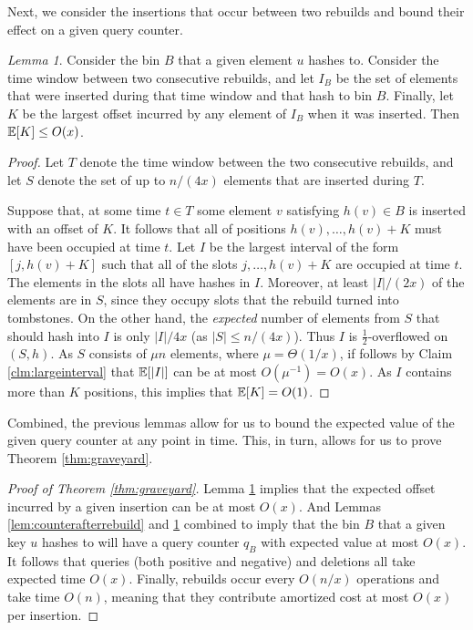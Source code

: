 \documentclass[10pt]{article}
\theoremstyle{remark}
\newtheorem{lemma}[thm]{Lemma}
\theoremstyle{remark}
\begin{document}
Next, we consider the insertions that occur between two rebuilds and bound their effect on a given query counter.

\begin{lemma}
Consider the bin $B$ that a given element $u$ hashes to. Consider the time window between two consecutive rebuilds, and let $I_B$ be the set of elements that were inserted during that time window and that hash to bin $B$. Finally, let $K$ be the largest offset incurred by any element of $I_B$ when it was inserted. Then $\mathbb{E}[K] \le O(x)$.
\label{lem:counterbetweenrebuilds}
\end{lemma}
\begin{proof}
Let $T$ denote the time window between the two consecutive rebuilds, and let $S$ denote the set of up to $n / (4x)$ elements that are inserted during $T$.

Suppose that, at some time $t \in T$ some element $v$ satisfying $h(v) \in B$ is inserted with an offset of $K$. It follows that all of positions $h(v), \ldots, h(v) + K$ must have been occupied at time $t$. Let $I$ be the largest interval of the form $[j, h(v) + K]$ such that all of the slots $j, \ldots, h(v) + K$ are occupied at time $t$. The elements in the slots all have hashes in $I$. Moreover, at least $|I| / (2x)$ of the elements are in $S$, since they occupy slots that the rebuild turned into tombstones. On the other hand, the \emph{expected} number of elements from $S$ that should hash into $I$ is only $|I| / 4x$ (as $|S| \le n/(4x)$). Thus $I$ is $\frac{1}{2}$-overflowed on $(S, h)$. As $S$ consists of $\mu n$ elements, where $\mu = \Theta(1/x)$, if follows by Claim \ref{clm:largeinterval} that $\mathbb{E}[|I|]$ can be at most $O(\mu^{-1}) = O(x)$. As $I$ contains more than $K$ positions, this implies that $\mathbb{E}[K] = O(1)$. 
\end{proof}

Combined, the previous lemmas allow for us to bound the expected value of the given query counter at any point in time. This, in turn, allows for us to prove Theorem \ref{thm:graveyard}.

\begin{proof}[Proof of Theorem \ref{thm:graveyard}]
Lemma \ref{lem:counterbetweenrebuilds} implies that the expected offset incurred by a given insertion can be at most $O(x)$. And Lemmas \ref{lem:counterafterrebuild} and \ref{lem:counterbetweenrebuilds} combined to imply that the bin $B$ that a given key $u$ hashes to will have a query counter $q_B$ with expected value at most $O(x)$. It follows that queries (both positive and negative) and deletions all take expected time $O(x)$. Finally, rebuilds occur every $O(n/x)$ operations and take time $O(n)$, meaning that they contribute amortized cost at most $O(x)$ per insertion.
\end{proof}
\end{document}
